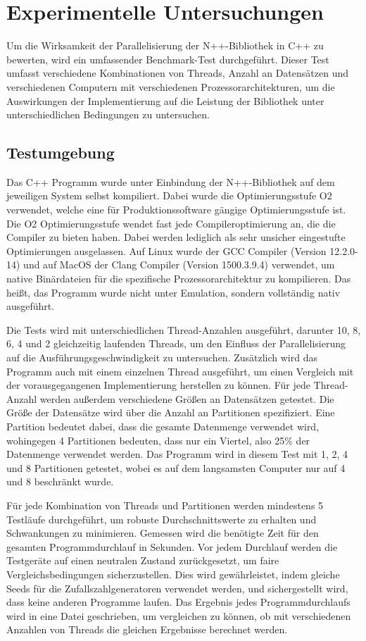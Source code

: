 \chapter{Experimentelle Untersuchungen}

Um die Wirksamkeit der Parallelisierung der N++-Bibliothek in C++ zu bewerten, wird ein umfassender Benchmark-Test durchgeführt. Dieser Test umfasst verschiedene Kombinationen von Threads, Anzahl an Datensätzen und verschiedenen Computern mit verschiedenen Prozessorarchitekturen, um die Auswirkungen der Implementierung auf die Leistung der Bibliothek unter unterschiedlichen Bedingungen zu untersuchen.

\section{Testumgebung}

Das C++ Programm wurde unter Einbindung der N++-Bibliothek auf dem jeweiligen System selbst kompiliert. Dabei wurde die Optimierungsstufe O2 verwendet, welche eine für Produktionssoftware gängige Optimierungsstufe ist. Die O2 Optimierungsstufe wendet fast jede Compileroptimierung an, die die Compiler zu bieten haben. Dabei werden lediglich als sehr unsicher eingestufte Optimierungen ausgelassen. Auf Linux wurde der GCC Compiler (Version 12.2.0-14) und auf MacOS der Clang Compiler (Version 1500.3.9.4) verwendet, um native Binärdateien für die spezifische Prozessorarchitektur zu kompilieren. Das heißt, das Programm wurde nicht unter Emulation, sondern vollständig nativ ausgeführt.

Die Tests wird mit unterschiedlichen Thread-Anzahlen ausgeführt, darunter 10, 8, 6, 4 und 2 gleichzeitig laufenden Threads, um den Einfluss der Parallelisierung auf die Ausführungsgeschwindigkeit zu untersuchen. Zusätzlich wird das Programm auch mit einem einzelnen Thread ausgeführt, um einen Vergleich mit der vorausgegangenen Implementierung herstellen zu können. Für jede Thread-Anzahl werden außerdem verschiedene Größen an Datensätzen getestet. Die Größe der Datensätze wird über die Anzahl an Partitionen spezifiziert. Eine Partition bedeutet dabei, dass die gesamte Datenmenge verwendet wird, wohingegen 4 Partitionen bedeuten, dass nur ein Viertel, also 25\% der Datenmenge verwendet werden. Das Programm wird in diesem Test mit 1, 2, 4 und 8 Partitionen getestet, wobei es auf dem langsamsten Computer nur auf 4 und 8 beschränkt wurde.

Für jede Kombination von Threads und Partitionen werden mindestens 5 Testläufe durchgeführt, um robuste Durchschnittswerte zu erhalten und Schwankungen zu minimieren. Gemessen wird die benötigte Zeit für den gesamten Programmdurchlauf in Sekunden. Vor jedem Durchlauf werden die Testgeräte auf einen neutralen Zustand zurückgesetzt, um faire Vergleichsbedingungen sicherzustellen. Dies wird gewährleistet, indem gleiche Seeds für die Zufallszahlgeneratoren verwendet werden, und sichergestellt wird, dass keine anderen Programme laufen.
Das Ergebnis jedes Programmdurchlaufs wird in eine Datei geschrieben, um vergleichen zu können, ob mit verschiedenen Anzahlen von Threads die gleichen Ergebnisse berechnet werden.

